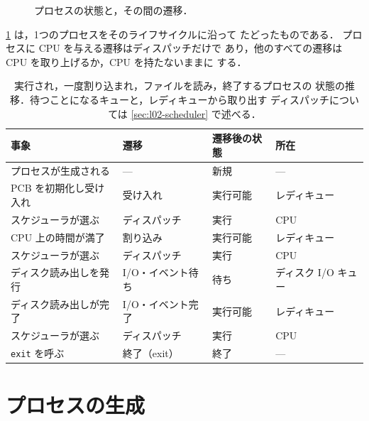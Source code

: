 \documentclass[../main.tex]{subfiles}
\begin{document}
\begin{figure}[htbp]
  \centering
  
  \caption{プロセスの状態と，その間の遷移．}
  \label{fig:l02-states}
\end{figure}

\cref{tab:l02-trace} は，1つのプロセスをそのライフサイクルに沿って
たどったものである．%
プロセスに CPU を与える遷移はディスパッチだけで
あり，他のすべての遷移は CPU を取り上げるか，CPU を持たないままに
する．

\begin{table}[htbp]
  \centering
  \small
  \caption{実行され，一度割り込まれ，ファイルを読み，終了するプロセスの
    状態の推移．待つことになるキューと，レディキューから取り出す
    ディスパッチについては \cref{sec:l02-scheduler} で述べる．}
  \label{tab:l02-trace}
  \begin{tabular}{@{}llll@{}}
    \toprule
    事象 & 遷移 & 遷移後の状態 & 所在 \\
    \midrule
    プロセスが生成される     & ---                   & 新規     & --- \\
    PCB を初期化し受け入れ   & 受け入れ              & 実行可能 & レディキュー \\
    スケジューラが選ぶ       & ディスパッチ          & 実行     & CPU \\
    CPU 上の時間が満了       & 割り込み              & 実行可能 & レディキュー \\
    スケジューラが選ぶ       & ディスパッチ          & 実行     & CPU \\
    ディスク読み出しを発行   & I/O・イベント待ち     & 待ち     & ディスク I/O キュー \\
    ディスク読み出しが完了   & I/O・イベント完了     & 実行可能 & レディキュー \\
    スケジューラが選ぶ       & ディスパッチ          & 実行     & CPU \\
    \texttt{exit} を呼ぶ     & 終了（exit）          & 終了     & --- \\
    \bottomrule
  \end{tabular}
\end{table}

\section{プロセスの生成}
\label{sec:l02-creation}
\end{document}
